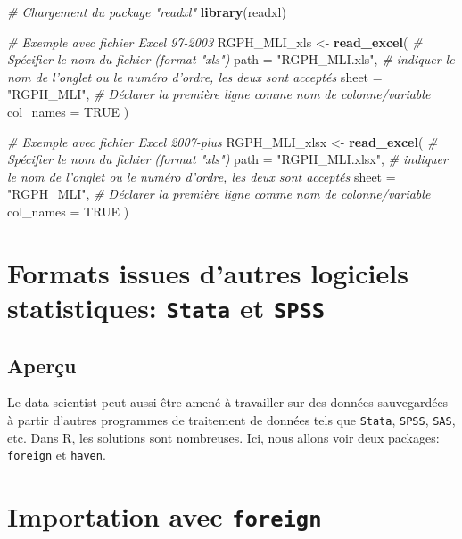 \documentclass[]{book}
\newenvironment{Shaded}{\begin{snugshade}}{\end{snugshade}}
\newcommand{\KeywordTok}[1]{\textcolor[rgb]{0.13,0.29,0.53}{\textbf{#1}}}
\newcommand{\DataTypeTok}[1]{\textcolor[rgb]{0.13,0.29,0.53}{#1}}
\newcommand{\StringTok}[1]{\textcolor[rgb]{0.31,0.60,0.02}{#1}}
\newcommand{\CommentTok}[1]{\textcolor[rgb]{0.56,0.35,0.01}{\textit{#1}}}
\newcommand{\OtherTok}[1]{\textcolor[rgb]{0.56,0.35,0.01}{#1}}
\newcommand{\NormalTok}[1]{#1}
\begin{document}
\begin{Shaded}
\begin{Highlighting}[]
\CommentTok{# Chargement du package "readxl"}
\KeywordTok{library}\NormalTok{(readxl) }

\CommentTok{# Exemple avec fichier Excel 97-2003}
\NormalTok{RGPH_MLI_xls <-}\StringTok{ }\KeywordTok{read_excel}\NormalTok{(}
\CommentTok{# Spécifier le nom du fichier (format "xls")}
\DataTypeTok{path =} \StringTok{"RGPH_MLI.xls"}\NormalTok{, }
\CommentTok{# indiquer le nom de l'onglet ou le numéro d'ordre, les deux sont acceptés}
\DataTypeTok{sheet =} \StringTok{"RGPH_MLI"}\NormalTok{, }
\CommentTok{# Déclarer la première ligne comme nom de colonne/variable}
\DataTypeTok{col_names =} \OtherTok{TRUE}
\NormalTok{)}

\CommentTok{# Exemple avec fichier Excel 2007-plus}
\NormalTok{RGPH_MLI_xlsx <-}\StringTok{ }\KeywordTok{read_excel}\NormalTok{(}
\CommentTok{# Spécifier le nom du fichier (format "xls")}
\DataTypeTok{path =} \StringTok{"RGPH_MLI.xlsx"}\NormalTok{, }
\CommentTok{# indiquer le nom de l'onglet ou le numéro d'ordre, les deux sont acceptés}
\DataTypeTok{sheet =} \StringTok{"RGPH_MLI"}\NormalTok{, }
\CommentTok{# Déclarer la première ligne comme nom de colonne/variable}
\DataTypeTok{col_names =} \OtherTok{TRUE}
\NormalTok{)}
\end{Highlighting}
\end{Shaded}

\section{\texorpdfstring{Formats issues d'autres logiciels statistiques:
\texttt{Stata} et
\texttt{SPSS}}{Formats issues d'autres logiciels statistiques: Stata et SPSS}}\label{formats-issues-dautres-logiciels-statistiques-stata-et-spss}

\subsection{Aperçu}\label{apercu-3}

Le data scientist peut aussi être amené à travailler sur des données
sauvegardées à partir d'autres programmes de traitement de données tels
que \texttt{Stata}, \texttt{SPSS}, \texttt{SAS}, etc. Dans R, les
solutions sont nombreuses. Ici, nous allons voir deux packages:
\texttt{foreign} et \texttt{haven}.

\section{\texorpdfstring{Importation avec
\texttt{foreign}}{Importation avec foreign}}\label{importation-avec-foreign}
\end{document}
